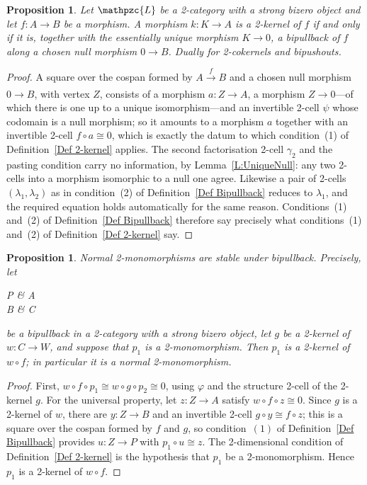 \documentclass[reqno,a4paper]{amsart}
\numberwithin{equation}{section}
\theoremstyle{plain}
\newtheorem{proposition}[subsection]{Proposition}
\theoremstyle{definition}
\def\nameit#1{\textrm{#1}~}
\def\lemx{\nameit{Lemma}}
\def\defx{\nameit{Definition}}
\newcommand{\comp}{\circ}
\newcommand{\iso}{\cong}
\def\phi{\varphi}
\newcommand{\catfont}[1]{\ensuremath{\mathpzc{#1}}\xspace}
\def\L{\catfont{L}}
\renewcommand{\1}{\onecat{1}}
\newcommand{\aar}[2][]{\xrightarrow[#1]{#2}}
\begin{document}
\begin{proposition}\label{Kernel vs pullback}
	Let \(\L\) be a 2-category with a strong bizero object and let \(f\colon A\to B\) be a morphism. A morphism \(k\colon K\to A\) is a 2-kernel of \(f\) if and only if it is, together with the essentially unique morphism \(K\to 0\), a bipullback of \(f\) along a chosen null morphism \(0\to B\). Dually for 2-cokernels and bipushouts.
\end{proposition}
\begin{proof}
	A square over the cospan formed by \(A\aar{f}B\) and a chosen null morphism \(0\to B\), with vertex \(Z\), consists of a morphism \(a\colon Z\to A\), a morphism \(Z\to 0\)---of which there is one up to a unique isomorphism---and an invertible 2-cell \(\psi\) whose codomain is a null morphism; so it amounts to a morphism \(a\) together with an invertible 2-cell \(f\comp a\iso 0\), which is exactly the datum to which condition~(1) of \defx\ref{Def 2-kernel} applies. The second factorisation 2-cell \(\gamma_2\) and the pasting condition carry no information, by \lemx\ref{L:UniqueNull}: any two 2-cells into a morphism isomorphic to a null one agree. Likewise a pair of 2-cells \((\lambda_1,\lambda_2)\) as in condition~(2) of \defx\ref{Def Bipullback} reduces to \(\lambda_1\), and the required equation holds automatically for the same reason. Conditions~(1) and~(2) of \defx\ref{Def Bipullback} therefore say precisely what conditions~(1) and~(2) of \defx\ref{Def 2-kernel} say.
\end{proof}

\begin{proposition}\label{P:NormalMonoBipullback}
	Normal 2-monomorphisms are stable under bipullback. Precisely, let
	\begin{cd}[7][7]
		P \arrow[r,"p_1"] \arrow[d,"p_2"'] \& A \arrow[d,"f"] \\
		B \arrow[r,"g"'] \& C
		\arrow[from=2-1,to=1-2,iso,"\phi"'{pos=0.5,inner sep=1ex}]
	\end{cd}
	be a bipullback in a 2-category with a strong bizero object, let \(g\) be a 2-kernel of \(w\colon C\to W\), and suppose that \(p_1\) is a 2-monomorphism. Then \(p_1\) is a 2-kernel of \(w\comp f\); in particular it is a normal 2-monomorphism.
\end{proposition}
\begin{proof}
	First, \(w\comp f\comp p_1\iso w\comp g\comp p_2\iso 0\), using \(\phi\) and the structure 2-cell of the 2-kernel \(g\). For the universal property, let \(z\colon Z\to A\) satisfy \(w\comp f\comp z\iso 0\). Since \(g\) is a 2-kernel of \(w\), there are \(y\colon Z\to B\) and an invertible 2-cell \(g\comp y\iso f\comp z\); this is a square over the cospan formed by \(f\) and \(g\), so condition~\((1)\) of \defx\ref{Def Bipullback} provides \(u\colon Z\to P\) with \(p_1\comp u\iso z\). The 2-dimensional condition of \defx\ref{Def 2-kernel} is the hypothesis that \(p_1\) be a 2-monomorphism. Hence \(p_1\) is a 2-kernel of \(w\comp f\).
\end{proof}
\end{document}
